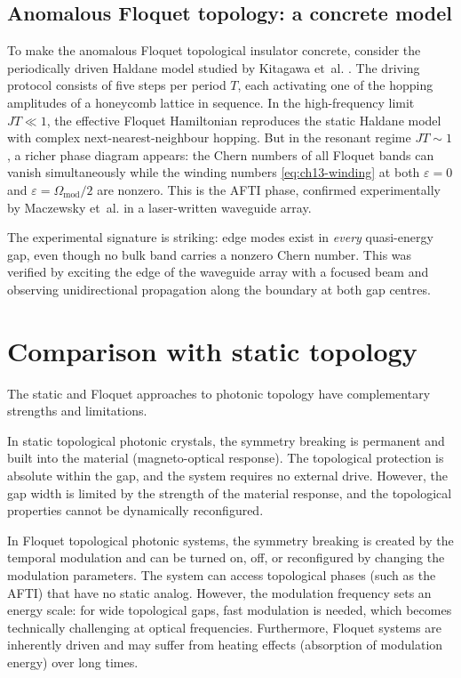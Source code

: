 \subsection{Anomalous Floquet topology: a concrete model}
\label{sec:ch13-afti-model}

To make the anomalous Floquet topological insulator concrete, consider
the periodically driven Haldane model studied by Kitagawa et~al.
\cite{kitagawa2010topological}.  The driving protocol consists of
five steps per period $T$, each activating one of the hopping
amplitudes of a honeycomb lattice in sequence.  In the high-frequency
limit $JT\ll 1$, the effective Floquet Hamiltonian reproduces the
static Haldane model with complex next-nearest-neighbour hopping.  But
in the resonant regime $JT\sim 1$, a richer phase diagram appears:
the Chern numbers of all Floquet bands can vanish simultaneously while
the winding numbers \eqref{eq:ch13-winding} at both $\varepsilon=0$
and $\varepsilon=\Omega_{\mathrm{mod}}/2$ are nonzero.  This is the
AFTI phase, confirmed experimentally by Maczewsky et~al.
\cite{maczewsky2017observation} in a laser-written waveguide array.

The experimental signature is striking: edge modes exist in
\emph{every} quasi-energy gap, even though no bulk band carries a
nonzero Chern number.  This was verified by exciting the edge of the
waveguide array with a focused beam and observing unidirectional
propagation along the boundary at both gap centres.

\section{Comparison with static topology}
\label{sec:ch13-comparison}

The static and Floquet approaches to photonic topology have
complementary strengths and limitations.

In static topological photonic crystals, the symmetry breaking is
permanent and built into the material (magneto-optical response).  The
topological protection is absolute within the gap, and the system
requires no external drive.  However, the gap width is limited by the
strength of the material response, and the topological properties
cannot be dynamically reconfigured.

In Floquet topological photonic systems, the symmetry breaking is
created by the temporal modulation and can be turned on, off, or
reconfigured by changing the modulation parameters.  The system can
access topological phases (such as the AFTI) that have no static
analog.  However, the modulation frequency sets an energy scale: for
wide topological gaps, fast modulation is needed, which becomes
technically challenging at optical frequencies.  Furthermore, Floquet
systems are inherently driven and may suffer from heating effects
(absorption of modulation energy) over long times.

